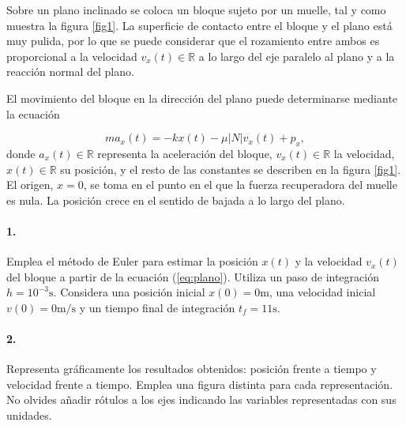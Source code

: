 Sobre un plano inclinado se coloca un bloque sujeto por un muelle, tal y como muestra la figura \ref{fig1}. La superficie de contacto entre el bloque y el plano está muy pulida, por lo que se puede considerar que el rozamiento entre ambos es proporcional a la velocidad $v_x(t)\in\mathbb{R}$ a lo largo del eje paralelo al plano y a la reacción normal del plano.

El movimiento del bloque en la dirección del plano puede determinarse mediante la ecuación

\begin{equation}
	ma_{x}(t) = -kx(t) -\mu \lvert N \lvert v_x(t) + p_x, \label{eq:plano}
\end{equation}
donde $a_x(t)\in\mathbb{R}$ representa la aceleración del bloque, $v_x(t) \in\mathbb{R}$ la velocidad, $x(t)\in\mathbb{R}$ su posición, y el resto de las constantes se describen en la figura \ref{fig1}. El origen, $x=0$, se toma en el punto en el que la fuerza recuperadora del muelle es nula. La posición crece en el sentido de bajada a lo largo del plano.

\paragraph{1.} Emplea el método de Euler para estimar la posición $x(t)$ y la velocidad $v_x(t)$ del bloque a partir de la ecuación (\ref{eq:plano}). Utiliza un paso de integración $h =10^{-3}\text{s}$. Considera una posición inicial $x(0) =0\text{m}$, una velocidad inicial $v(0) = 0\text{m/s}$ y un tiempo final de integración $t_{f}=11\text{s}$.

\paragraph{2.} Representa gráficamente los resultados obtenidos: posición frente a tiempo y velocidad frente a tiempo. Emplea una figura distinta para cada representación. No olvides añadir rótulos a los ejes indicando las variables representadas con sus unidades.

